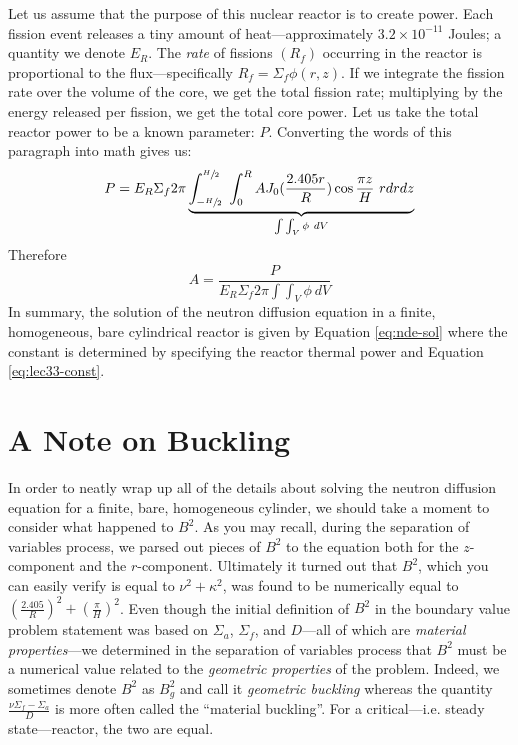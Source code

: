 Let us assume that the purpose of this nuclear reactor is to create power.  Each fission event releases a tiny amount of heat---approximately $3.2\times 10^{-11}$ Joules; a quantity we denote $E_R$. The \emph{rate} of fissions $(R_f)$ occurring in the reactor is proportional to the flux---specifically $R_f = \Sigma_f \phi(r,z)$.  If we integrate the fission rate over the volume of the core, we get the total fission rate; multiplying by the energy released per fission, we get the total core power.  Let us take the total reactor power to be a known parameter: $P$.  Converting the words of this paragraph into math gives us:
\begin{equation}
P = E_R \Sigma_f 2 \pi \underbrace{\int_{-\sfrac{H}{2}}^{\sfrac{H}{2}} \ \int_0^R AJ_0(\frac{2.405 r}{R})\cos{\frac{\pi z}{H}} \ r dr dz}_{\int \int_{V} \phi \ dV}
\end{equation}
Therefore
\begin{equation}
A = \frac{P}{E_R \Sigma_f 2\pi \int \int_{V} \phi \ dV}
\label{eq:lec33-const}
\end{equation}
In summary, the solution of the neutron diffusion equation in a finite, homogeneous, bare cylindrical reactor is given by Equation \ref{eq:nde-sol} where the constant is determined by specifying the reactor thermal power and Equation \ref{eq:lec33-const}.

\section{A Note on Buckling}
In order to neatly wrap up all of the details about solving the neutron diffusion equation for a finite, bare, homogeneous cylinder, we should take a moment to consider what happened to $B^2$.  As you may recall, during the separation of variables process, we parsed out pieces of $B^2$ to the equation both for the $z$-component and the $r$-component.  Ultimately it turned out that $B^2$, which you can easily verify is equal to $\nu^2 + \kappa^2$, was found to be numerically equal to $\left(\frac{2.405}{R} \right)^2 + \left(\frac{\pi}{H} \right)^2$.  Even though the initial definition of $B^2$ in the boundary value problem statement was based on $\Sigma_a$, $\Sigma_f$, and $D$---all of which are \emph{material properties}---we determined in the separation of variables process that $B^2$ must be a numerical value related to the \emph{geometric properties} of the problem.  Indeed, we sometimes denote $B^2$ as $B_g^2$ and call it \emph{geometric buckling} whereas the quantity $\frac{\nu \Sigma_f - \Sigma_a}{D}$ is more often called the ``material buckling''.  For a critical---i.e. steady state---reactor, the two are equal. 

